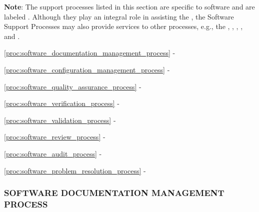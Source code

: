 		\begin{adjustwidth}{1em}{0pt}
			
			{\bf Note}: The support processes listed in this section are specific to software and are labeled . Although they play an integral role in assisting the , the Software Support Processes may also provide services to other processes, e.g., the , , , , and .

			\begin{compactitem}

				\item \ref{proc:software_documentation_management_process} - 

				\item \ref{proc:software_configuration_management_process} - 

				\item \ref{proc:software_quality_assurance_process} - 

				\item \ref{proc:software_verification_process} - 

				\item \ref{proc:software_validation_process} - 

				\item \ref{proc:software_review_process} - 

				\item \ref{proc:software_audit_process} - 

				\item \ref{proc:software_problem_resolution_process} - 

			\end{compactitem}

		\end{adjustwidth}

		\newpage
		\subsubsection{SOFTWARE DOCUMENTATION MANAGEMENT PROCESS\label{proc:software_documentation_management_process}}

